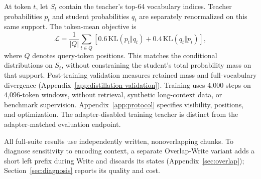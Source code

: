 At token $t$, let $S_t$ contain the teacher's top-64 vocabulary indices. Teacher probabilities $p_t$ and student probabilities $q_t$ are separately renormalized on this same support. The token-mean objective is
\begin{equation}
 \mathcal{L}=\frac{1}{|Q|}\sum_{t\in Q}
 \left[0.6\,\mathrm{KL}(p_t\Vert q_t)+0.4\,\mathrm{KL}(q_t\Vert p_t)\right],
 \label{eq:distill}
\end{equation}
where $Q$ denotes query-token positions. This matches the conditional distributions on $S_t$, without constraining the student's total probability mass on that support. Post-training validation measures retained mass and full-vocabulary divergence (Appendix~\ref{app:distillation-validation}). Training uses 4,000 steps on 4,096-token windows, without retrieval, synthetic long-context data, or benchmark supervision. Appendix~\ref{app:protocol} specifies visibility, positions, and optimization. The adapter-disabled training teacher is distinct from the adapter-matched evaluation endpoint.

All full-suite results use independently written, nonoverlapping chunks. To diagnose sensitivity to encoding context, a separate Overlap-Write variant adds a short left prefix during Write and discards its states (Appendix~\ref{sec:overlap}); Section~\ref{sec:diagnosis} reports its quality and cost.
